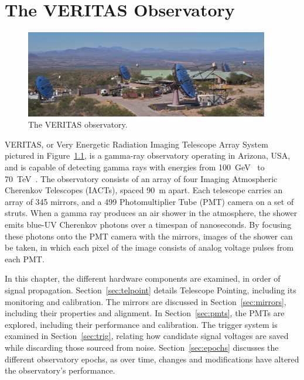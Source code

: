 \cleartooddpage[\thispagestyle{empty}]
\chapter{The VERITAS Observatory}\label{chapter:veritas}

\begin{figure}[ht]
  \centering
  \includegraphics[width=0.95\textwidth]{images/veritas_array_v6}
  \caption[VERITAS Array]{
    The VERITAS observatory.}
  \label{fig:veritasarray}
\end{figure}

VERITAS, or Very Energetic Radiation Imaging Telescope Array System pictured in Figure~\ref{fig:veritasarray}, is a gamma-ray observatory operating in Arizona, USA, and is capable of detecting gamma rays with energies from \SI{100}{\GeV{}} to \SI{70}{\TeV{}}.
The observatory consists of an array of four Imaging Atmospheric Cherenkov Telescopes (IACTs), spaced \nicetilde{}\SI{90}{m} apart.
Each telescope carries an array of 345 mirrors, and a 499 Photomultiplier Tube (PMT) camera on a set of struts.
When a gamma ray produces an air shower in the atmosphere, the shower emits blue-UV Cherenkov photons over a timespan of nanoseconds.
By focusing these photons onto the PMT camera with the mirrors, images of the shower can be taken, in which each pixel of the image consists of analog voltage pulses from each PMT.


In this chapter, the different hardware components are examined, in order of signal propagation.
Section~\ref{sec:telpoint} details Telescope Pointing, including its monitoring and calibration.
The mirrors are discussed in Section~\ref{sec:mirrors}, including their properties and alignment.
In Section~\ref{sec:pmts}, the PMTs are explored, including their performance and calibration.
The trigger system is examined in Section~\ref{sec:trig}, relating how candidate signal voltages are saved while discarding those sourced from noise.
Section~\ref{sec:epochs} discusses the different observatory epochs, as over time, changes and modifications have altered the observatory's performance.


